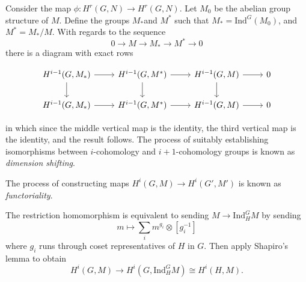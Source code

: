 \documentclass[a4paper, 12pt,oneside,openany]{book}
\begin{document}
Consider the map $\phi: H^r(G, N) \to H^r(G, N)$. Let $M_0$ be the abelian group structure of $M$. Define the groups $M_*$and $M^*$ such that $M_* = \text{Ind}^G(M_0)$, and $M^* = M_* / M$. With regards to the sequence $$0 \to M \to M_* \to M^* \to 0$$ there is a diagram with exact rows

\[
\begin{tikzcd}
H^{i-1}(G, M_*) \arrow{r}\arrow{d}& H^{i-1}(G, M^*) \arrow{r} \arrow{d} &H^{i-1}(G, M) \arrow{r} \arrow{d} &0 \\
H^{i-1}(G, M_*) \arrow{r}& H^{i-1}(G, M^*) \arrow{r}  &H^{i-1}(G, M) \arrow{r}  &0 
\end{tikzcd}
\]

in which since the middle vertical map is the identity, the third vertical map is the identity, and the result follows. The process of suitably establishing isomorphisms between $i$-cohomology and $i+1$-cohomology groups is known as \emph{dimension shifting}.


The process of constructing maps $H^i(G, M) \to H^i(G', M')$ is known as \emph{functoriality}. 


The restriction homomorphism is equivalent to sending $M \to \text{Ind}_H^GM$ by sending $$m \mapsto \sum\limits_i m^{g_i} \otimes [g_i^{-1}]$$ where $g_i$ runs through coset representatives of $H$ in $G$. Then apply Shapiro's lemma to obtain $$H^i(G, M) \to H^i(G, \text{Ind}_H^G M) \cong H^i(H, M).$$
\end{document}
